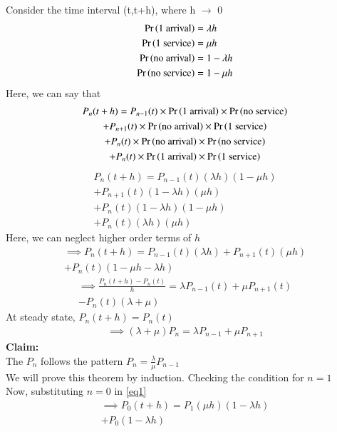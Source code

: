 \documentclass[journal,12pt,twocolumn]{IEEEtran}
\begin{document}
Consider the time interval (t,t+h), where h $\rightarrow$ 0
\begin{align}
    \Pr\left(\text{1 arrival}\right) &= \lambda h\\
    \Pr\left(\text{1 service}\right) &= \mu h\\
    \Pr\left(\text{no arrival}\right) &= 1-\lambda h\\
    \Pr\left(\text{no service}\right) &= 1- \mu h \\
\end{align}
Here, we can say that 
\begin{multline}
    P_n(t+h)=P_{n-1}(t)\times\Pr\left(\text{1 arrival}\right)\times \Pr\left(\text{no service}\right)\\ +P_{n+1}(t)\times\Pr\left(\text{no arrival}\right)\times\Pr\left(\text{1 service}\right) \\+ P_n(t)\times \Pr\left(\text{no arrival}\right)\times\Pr\left(\text{no service}\right)\\ + P_n(t) \times \Pr\left(\text{1 arrival}\right) \times\Pr\left(\text{1 service}\right) \label{eq1}
\end{multline}
\begin{multline}
    P_n(t+h)=P_{n-1}(t)(\lambda h)(1-\mu h)\\+P_{n+1}(t)(1-\lambda h)(\mu h) \\+P_n(t)(1-\lambda h)(1-\mu h)\\+P_n(t)(\lambda h)(\mu h)
\end{multline}
Here, we can neglect higher order terms of $h$
\begin{multline}
    \implies P_n(t+h)=P_{n-1}(t)(\lambda h)+P_{n+1}(t)(\mu h)\\+P_n(t)(1-\mu h - \lambda h) \label{eq2}
\end{multline}
\begin{multline}
    \implies \frac{P_n(t+h)-P_n(t)}{h}=\lambda P_{n-1}(t)+\mu P_{n+1}(t)\\- P_n(t)(\lambda + \mu ) \label{eq3}
\end{multline}
At steady state, $P_n(t+h)=P_n(t)$
\begin{align}
     \implies (\lambda + \mu)P_n = \lambda P_{n-1}+\mu P_{n+1} \label{eq4}
\end{align}
\textbf{Claim:}\\
The $P_n$ follows the pattern $P_n = \frac{\lambda}{\mu}P_{n-1}$\\
We will prove this theorem by induction.
Checking the condition for $n=1$\\
Now, substituting $n=0$ in \eqref{eq1}
\begin{multline}
    \implies P_0(t+h)=P_{1}(\mu h)(1-\lambda h) \\+ P_0(1-\lambda h)
\end{multline}
\end{document}
